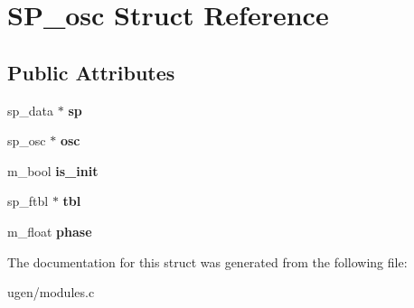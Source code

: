 \hypertarget{structSP__osc}{}\section{S\+P\+\_\+osc Struct Reference}
\label{structSP__osc}
\subsection*{Public Attributes}
\begin{DoxyCompactItemize}
\item 
\hypertarget{structSP__osc_a91c42e7258d952ef6a0f5b34480a4952}{}\label{structSP__osc_a91c42e7258d952ef6a0f5b34480a4952} 
sp\+\_\+data $\ast$ {\bfseries sp}
\item 
\hypertarget{structSP__osc_a959ca67eaeb1e6faa8f940e94f0655bc}{}\label{structSP__osc_a959ca67eaeb1e6faa8f940e94f0655bc} 
sp\+\_\+osc $\ast$ {\bfseries osc}
\item 
\hypertarget{structSP__osc_a08f8db10856b7f4649b3b6944a0621df}{}\label{structSP__osc_a08f8db10856b7f4649b3b6944a0621df} 
m\+\_\+bool {\bfseries is\+\_\+init}
\item 
\hypertarget{structSP__osc_a5d5bd734273cdb665f28769cc9455be4}{}\label{structSP__osc_a5d5bd734273cdb665f28769cc9455be4} 
sp\+\_\+ftbl $\ast$ {\bfseries tbl}
\item 
\hypertarget{structSP__osc_ab0520678036d63b801beb51329bc78dd}{}\label{structSP__osc_ab0520678036d63b801beb51329bc78dd} 
m\+\_\+float {\bfseries phase}
\end{DoxyCompactItemize}


The documentation for this struct was generated from the following file\+:\begin{DoxyCompactItemize}
\item 
ugen/modules.\+c\end{DoxyCompactItemize}
